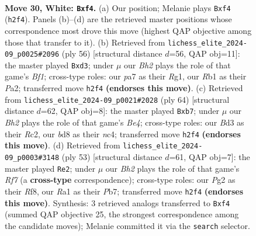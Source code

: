 \documentclass[11pt]{article}
\begin{document}
\clearpage

\begin{figure}[p]\centering
\begin{subfigure}{0.46\textwidth}\centering
\resizebox{\linewidth}{!}{%
\newchessgame
\chessboard[
  setfen={2rb2nr/p4k1p/2p5/8/5p2/3B3P/PPP2KPB/RR6 w - - 0 30},
  showmover=false,
  pgfstyle=straightmove, color=movearrow, markmove={h2-f4}
]}
\caption{}
\end{subfigure}\hfill
\begin{subfigure}{0.46\textwidth}\centering
\resizebox{\linewidth}{!}{%
\newchessgame
\chessboard[
  setfen={8/p3k2p/4rp2/2p5/8/2PppK1P/PP4P1/R4BR1 w - - 0 29},
  showmover=false,
  pgfstyle=straightmove, color=movearrow, markmove={f1-d3}
]}
\caption{}
\end{subfigure}
\\[4pt]
\begin{subfigure}{0.46\textwidth}\centering
\resizebox{\linewidth}{!}{%
\newchessgame
\chessboard[
  setfen={4r1k1/1p3pb1/4p1p1/8/r1nPBBP1/8/2R2P2/3R2K1 w - - 0 33},
  showmover=false,
  pgfstyle=straightmove, color=movearrow, markmove={e4-b7}
]}
\caption{}
\end{subfigure}\hfill
\begin{subfigure}{0.46\textwidth}\centering
\resizebox{\linewidth}{!}{%
\newchessgame
\chessboard[
  setfen={5rk1/1p2b1pp/p2p4/3Pp3/P6P/2P5/1P1N1r2/K2R3R b - - 0 27},
  showmover=false,
  pgfstyle=straightmove, color=movearrow, markmove={f2-e2}
]}
\caption{}
\end{subfigure}
\caption{\textbf{Move 30, White: \texttt{Bxf4}.} (a) Our position; Melanie plays \texttt{Bxf4} (\texttt{h2f4}). Panels (b)--(d) are the retrieved master positions whose correspondence most drove this move (highest QAP objective among those that transfer to it). (b) Retrieved from \texttt{lichess\_elite\_2024-09\_p0025\#2096} (ply 56) [structural distance $d$=56, QAP obj=11]: the master played \texttt{Bxd3}; under $\mu$ our \emph{Bh2} plays the role of that game's \emph{Bf1}; cross-type roles: our \emph{p}a7 as their \emph{R}g1, our \emph{R}b1 as their \emph{P}a2; transferred move \texttt{h2f4} \textbf{(endorses this move)}. (c) Retrieved from \texttt{lichess\_elite\_2024-09\_p0021\#2028} (ply 64) [structural distance $d$=62, QAP obj=8]: the master played \texttt{Bxb7}; under $\mu$ our \emph{Bh2} plays the role of that game's \emph{Be4}; cross-type roles: our \emph{B}d3 as their \emph{R}c2, our \emph{b}d8 as their \emph{n}c4; transferred move \texttt{h2f4} \textbf{(endorses this move)}. (d) Retrieved from \texttt{lichess\_elite\_2024-09\_p0003\#3148} (ply 53) [structural distance $d$=61, QAP obj=7]: the master played \texttt{Re2}; under $\mu$ our \emph{Bh2} plays the role of that game's \emph{Rf7} (a \textbf{cross-type} correspondence); cross-type roles: our \emph{P}g2 as their \emph{R}f8, our \emph{R}a1 as their \emph{P}b7; transferred move \texttt{h2f4} \textbf{(endorses this move)}. Synthesis: 3 retrieved analogs transferred to \texttt{Bxf4} (summed QAP objective 25, the strongest correspondence among the candidate moves); Melanie committed it via the \texttt{search} selector.}
\label{fig:thought-m58}
\end{figure}
\end{document}
